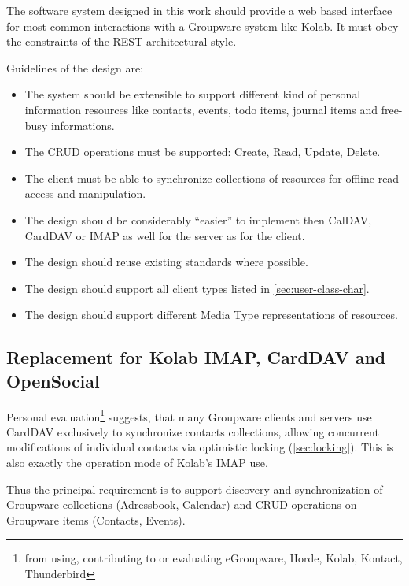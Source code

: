 \documentclass[12pt,a4paper,twoside]{scrartcl}		%
\begin{document}
The software system designed in this work should provide a web based interface
for most common interactions with a Groupware system like Kolab. It must obey
the constraints of the REST architectural style\cite{Fielding2000}.

Guidelines of the design are:

\begin{itemize}
\item The system should be extensible to support different kind of personal
  information resources like contacts, events, todo items, journal items and
  free-busy informations.
  \item The CRUD operations must be supported: Create, Read, Update, Delete.
  \item The client must be able to synchronize collections of resources for
    offline read access and manipulation.
  \item The design should be considerably ``easier'' to implement then CalDAV,
    CardDAV or IMAP as well for the server as for the client.
  \item The design should reuse existing standards where possible.
  \item The design should support all client types listed in
    \autoref{sec:user-class-char}.
  \item The design should support different Media Type representations of
    resources.
\end{itemize}



\subsection{Replacement for Kolab IMAP, CardDAV and OpenSocial}
\label{sec:replacement-carddav}

Personal evaluation\footnote{from using, contributing to or evaluating
  eGroupware, Horde, Kolab, Kontact, Thunderbird} suggests, that many Groupware
clients and servers use CardDAV exclusively to synchronize contacts collections,
allowing concurrent modifications of individual contacts via optimistic locking
(\autoref{sec:locking}). This is also exactly the operation mode of Kolab's IMAP
use.

Thus the principal requirement is to support discovery and synchronization of
Groupware collections (Adressbook, Calendar) and CRUD operations on Groupware
items (Contacts, Events).
\end{document}
